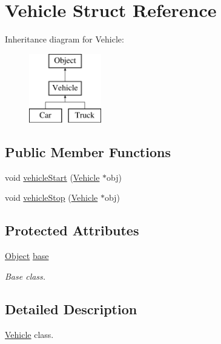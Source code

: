 \hypertarget{struct_vehicle}{}\section{Vehicle Struct Reference}
\label{struct_vehicle}
Inheritance diagram for Vehicle\+:\begin{figure}[H]
\begin{center}
\leavevmode
\includegraphics[height=3.000000cm]{struct_vehicle}
\end{center}
\end{figure}
\subsection*{Public Member Functions}
\begin{DoxyCompactItemize}
\item 
void \mbox{\hyperlink{struct_vehicle_a6891d3d28853bc3fdd075596dc6de9f8}{vehicle\+Start}} (\mbox{\hyperlink{struct_vehicle}{Vehicle}} $\ast$obj)
\item 
void \mbox{\hyperlink{struct_vehicle_a4dcbcba43792dcd673a552b14479ab77}{vehicle\+Stop}} (\mbox{\hyperlink{struct_vehicle}{Vehicle}} $\ast$obj)
\end{DoxyCompactItemize}
\subsection*{Protected Attributes}
\begin{DoxyCompactItemize}
\item 
\mbox{\hyperlink{struct_object}{Object}} \mbox{\hyperlink{struct_vehicle_ad7970f528d429f6fc1725173e93a77c2}{base}}
\begin{DoxyCompactList}\small\item\em Base class. \end{DoxyCompactList}\end{DoxyCompactItemize}


\subsection{Detailed Description}
\mbox{\hyperlink{struct_vehicle}{Vehicle}} class. 

